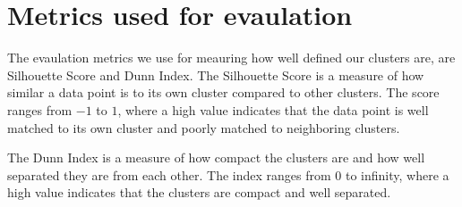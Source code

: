 
\section{Metrics used for evaulation}

The evaulation metrics we use for meauring how well defined our clusters are, are Silhouette Score and Dunn Index. The Silhouette Score is a measure of how similar a data point is to its own cluster compared to other clusters. The score ranges from $-1$ to $1$, where a high value indicates that the data point is well matched to its own cluster and poorly matched to neighboring clusters. 
\par
The Dunn Index is a measure of how compact the clusters are and how well separated they are from each other. The index ranges from $0$ to infinity, where a high value indicates that the clusters are compact and well separated.